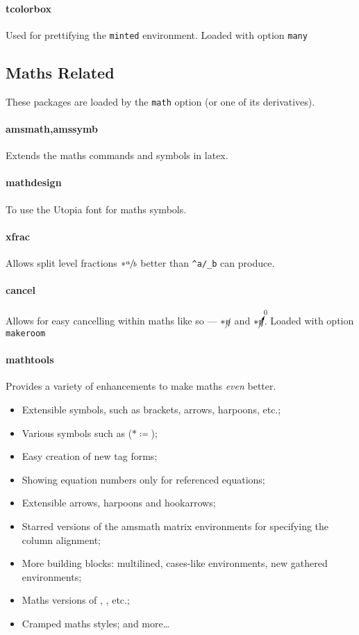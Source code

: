 \documentclass[solid,math,chem,code,plot,gloss]{bmc}
\begin{document}
\paragraph{\ttfamily tcolorbox}\label{par:tcolorbox}
Used for prettifying the \texttt{minted} environment.
Loaded with option \texttt{many}

\subsection{Maths Related}
These packages are loaded by the \texttt{math}
option (or one of its derivatives).

\paragraph{\ttfamily amsmath,amssymb}\label{par:amssymb}
Extends the maths commands and symbols in latex.
\paragraph{\ttfamily mathdesign}\label{par:mathdesign}
To use the Utopia font for maths symbols.
\paragraph{\ttfamily xfrac}\label{par:xfrac}
Allows split level fractions \(*\sfrac{a}{b}\) better than \texttt{{}^{a}/{}_{b}} can produce.
\paragraph{\ttfamily cancel}\label{par:cancel}
Allows for easy cancelling within maths like so ---
\(*\cancel{\eta}\) and \(*\cancelto{0}{\eta}\).
Loaded with option \texttt{makeroom}
\paragraph{\ttfamily mathtools}\label{par:mathtools}
Provides a variety of enhancements to make maths \emph{even} better.
\begin{itemize}
    \item Extensible symbols, such as brackets, arrows, harpoons, etc.;
    \item Various symbols such as \texttt{\coloneqq} (\(*\coloneqq\));
    \item Easy creation of new tag forms;
    \item Showing equation numbers only for referenced equations;
    \item Extensible arrows, harpoons and hookarrows;
    \item Starred versions of the amsmath matrix environments for specifying the column alignment;
    \item More building blocks: multilined, cases-like environments, new gathered environments;
    \item Maths versions of \texttt{\makebox}, \texttt{\llap}, \texttt{\rlap} etc.;
    \item Cramped maths styles; and more\dots
\end{itemize}
\end{document}
